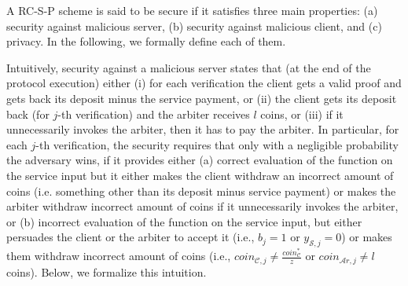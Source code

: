 
A RC-S-P scheme is said to be secure if it satisfies  three main properties: (a)  security against malicious server, (b) security against malicious client, and (c) privacy.  In the following, we formally define each of them.

 Intuitively, security against a malicious server states that (at the end of the protocol execution) either (i) for each verification the client gets a valid proof and gets back its deposit minus the service payment, or (ii) the client gets its deposit back (for $j$-th verification) and the arbiter receives $l$ coins, or (iii) if it unnecessarily invokes the arbiter, then it has to pay the arbiter. In particular, for each $j$-th verification, the security requires that only with a negligible probability the adversary wins, if it  provides either (a)  correct evaluation of the function on the service input but it either makes the client  withdraw an incorrect amount of coins (i.e. something other than its deposit minus service payment) or makes the arbiter withdraw incorrect amount of coins if it unnecessarily invokes the arbiter, or (b) incorrect evaluation of the function on the service input,  but either persuades the client or the arbiter to accept it (i.e.,  $b_{\scriptscriptstyle j}=1$ or $y_{\scriptscriptstyle\mathcal S,j}=0$) or makes them  withdraw incorrect amount of coins (i.e., $coin_{\scriptscriptstyle\mathcal{C},j}\neq \frac{coin_{\scriptscriptstyle\mathcal C}^{\scriptscriptstyle*}}{z}$ or  $coin_{\scriptscriptstyle\mathcal{A}r,j}\neq l$ coins).  Below, we formalize this intuition. 






